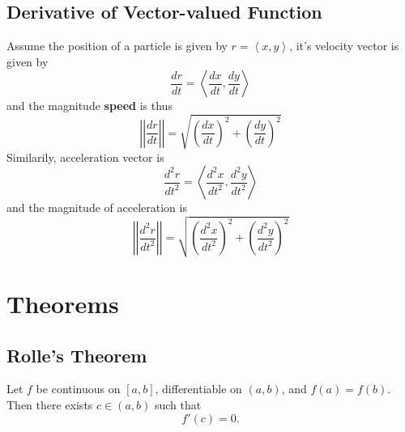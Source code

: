 \documentclass[11pt]{article}
\begin{document}
\subsection{Derivative of Vector-valued Function}
Assume the position of a particle is given by $r=\left<x,y\right>$, it's velocity vector is given by 
\[
    \frac{dr}{dt}=\left<\frac{dx}{dt}, \frac{dy}{dt}\right>
\]
and the magnitude \textbf{speed} is thus
\[
    \left|\left|\frac{dr}{dt}\right|\right|=\sqrt{{\left(\frac{dx}{dt}\right)}^2+ {\left(\frac{dy}{dt}\right)}^2}
\]
Similarily, acceleration vector is
\[
    \frac{d^2r}{{dt}^2}=\left<\frac{d^2x}{{dt}^2}, \frac{d^2y}{{dt}^2}\right>
\]    
and the magnitude of acceleration is
\[
    \left|\left|\frac{d^2r}{{dt}^2}\right|\right|=\sqrt{{\left(\frac{d^2x}{{dt}^2}\right)}^2+ {\left(\frac{d^2y}{{dt}^2}\right)}^2}
\]

\section{Theorems}
\subsection{Rolle's Theorem}
Let $f$ be continuous on $[a, b]$, differentiable on $(a, b)$, and $f(a) = f(b)$.  
Then there exists $c \in (a, b)$ such that
\[
    f'(c) = 0.
\]
\begin{center}
\end{center}
\end{document}
